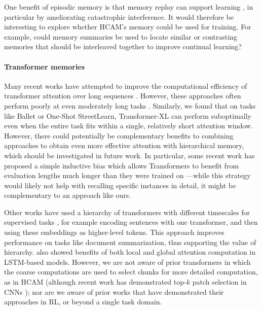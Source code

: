 \documentclass{article}
\begin{document}
One benefit of episodic memory is that memory replay can support learning \citep{kumaran2016learning, mcclelland1995there}, in particular by ameliorating catastrophic interference. It would therefore be interesting to explore whether HCAM's memory could be used for training. For example, could memory summaries be used to locate similar or contrasting memories that should be interleaved together \citep{mcclelland2020integration} to improve continual learning?\vspace{-0.5em}

\paragraph{Transformer memories} 
Many recent works have attempted to improve the computational efficiency of transformer attention over long sequences \citep[e.g.][]{kitaev2020reformer,wang2020linformer}. However, these approaches often perform poorly at even moderately long tasks \citep{tay2021long}. Similarly, we found that on tasks like Ballet or One-Shot StreetLearn, Transformer-XL can perform suboptimally even when the entire task fits within a single, relatively short attention window. However, there could potentially be complementary benefits to combining approaches to obtain even more effective attention with hierarchical memory, which should be investigated in future work. In particular, some recent work has proposed a simple inductive bias which allows Transformers to benefit from evaluation lengths much longer than they were trained on \citep{press2021train}---while this strategy would likely not help with recalling specific instances in detail, it might be complementary to an approach like ours.

Other works have used a hierarchy of transformers with different timescales for supervised tasks \citep{liu-lapata-2019-hierarchical,zhang2019hibert,yang2020html,li2020isarstep}, for example encoding sentences with one transformer, and then using these embeddings as higher-level tokens. This approach improves performance on tasks like document summarization, thus supporting the value of hierarchy. \citet{luong2015effective} also showed benefits of both local and global attention computation in LSTM-based models. However, we are not aware of prior transformers in which the coarse computations are used to select chunks for more detailed computation, as in HCAM (although recent work has demonstrated top-\(k\) patch selection in CNNs \citep{cordonnier2021differentiable}); nor are we aware of prior works that have demonstrated their approaches in RL, or beyond a single task domain.\vspace{-0.5em}
\end{document}
